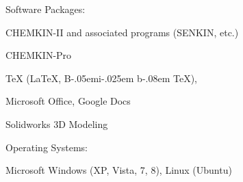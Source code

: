 \documentclass[10pt]{article}
\newcommand{\halfblankline}{\quad\vspace{-0.5\baselineskip}\pagebreak[3]}
\providecommand\BibTeX{{B\kern-.05em{\sc i\kern-.025em b}\kern-.08em \TeX}}
\begin{document}
Software Packages:
%
\begin{innerlist}
    \item CHEMKIN-II and associated programs (SENKIN, etc.)
    \item CHEMKIN-Pro
    \item \TeX{} (\LaTeX{}, \BibTeX{}),
    \item Microsoft Office, Google Docs
    \item Solidworks 3D Modeling
\end{innerlist}

\halfblankline

Operating Systems:
%
\begin{innerlist}
    \item Microsoft Windows (XP, Vista, 7, 8), Linux (Ubuntu)
\end{innerlist}
\end{document}

